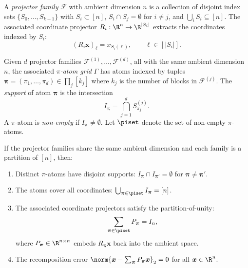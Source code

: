 \documentclass[11pt]{article}
\begin{document}
\begin{definition}
A \emph{projector family} $\mathcal{F}$ with ambient dimension $n$ is a
collection of disjoint index sets $\{S_0,\dots,S_{k-1}\}$ with
$S_i \subset [n]$, $S_i \cap S_j = \emptyset$ for $i\neq j$, and
$\bigcup_i S_i \subseteq [n]$.  The associated coordinate projector
$R_i : \R^n \to \R^{|S_i|}$ extracts the coordinates indexed by $S_i$:
\[
  (R_i \bm{x})_\ell = x_{S_i(\ell)}, \qquad \ell\in[|S_i|].
\]
\end{definition}

\begin{definition}
Given $d$ projector families $\mathcal{F}^{(1)},\dots,\mathcal{F}^{(d)}$, all
with the same ambient dimension $n$, the associated \emph{$\pi$-atom grid}
$\Gamma$ has atoms indexed by tuples
$\bm{\pi} = (\pi_1,\dots,\pi_d)\in\prod_j[k_j]$
where $k_j$ is the number of blocks in $\mathcal{F}^{(j)}$.  The
\emph{support} of atom $\bm{\pi}$ is the intersection
\[
  I_{\bm{\pi}} = \bigcap_{j=1}^d S^{(j)}_{\pi_j}.
\]
A $\pi$-atom is \emph{non-empty} if $I_{\bm{\pi}} \neq \emptyset$.  Let
$\piset$ denote the set of non-empty $\pi$-atoms.
\end{definition}

\begin{proposition}
\label{prop:ortho}
If the projector families share the same ambient dimension and each family
is a partition of $[n]$, then:
\begin{enumerate}[label=(\roman*)]
  \item Distinct $\pi$-atoms have disjoint supports:
    $I_{\bm{\pi}} \cap I_{\bm{\pi}'} = \emptyset$ for $\bm{\pi}\neq\bm{\pi}'$.
  \item The atoms cover all coordinates: $\bigcup_{\bm{\pi}\in\piset} I_{\bm{\pi}} = [n]$.
  \item The associated coordinate projectors satisfy the partition-of-unity:
    \[
      \sum_{\bm{\pi}\in\piset} P_{\bm{\pi}} = I_n,
    \]
    where $P_{\bm{\pi}}\in\R^{n\times n}$ embeds $R_{\bm{\pi}}\bm{x}$ back
    into the ambient space.
  \item The recomposition error
    $\norm{\bm{x} - \sum_{\bm{\pi}} P_{\bm{\pi}}\bm{x}}_2 = 0$
    for all $\bm{x}\in\R^n$.
\end{enumerate}
\end{proposition}
\end{document}
